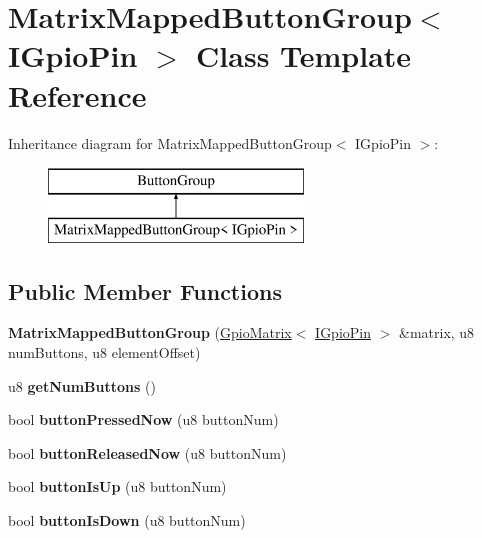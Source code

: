 \hypertarget{class_matrix_mapped_button_group}{}\section{Matrix\+Mapped\+Button\+Group$<$ I\+Gpio\+Pin $>$ Class Template Reference}
\label{class_matrix_mapped_button_group}
Inheritance diagram for Matrix\+Mapped\+Button\+Group$<$ I\+Gpio\+Pin $>$\+:\begin{figure}[H]
\begin{center}
\leavevmode
\includegraphics[height=2.000000cm]{class_matrix_mapped_button_group}
\end{center}
\end{figure}
\subsection*{Public Member Functions}
\begin{DoxyCompactItemize}
\item 
\mbox{\label{class_matrix_mapped_button_group_ab7ef8f08bf5dadc2a6761067f891e95e}} 
{\bfseries Matrix\+Mapped\+Button\+Group} (\mbox{\hyperlink{class_gpio_matrix}{Gpio\+Matrix}}$<$ \mbox{\hyperlink{class_i_gpio_pin}{I\+Gpio\+Pin}} $>$ \&matrix, u8 num\+Buttons, u8 element\+Offset)
\item 
\mbox{\label{class_matrix_mapped_button_group_a47bf73a3e9dadc326373af0a37f995e8}} 
u8 {\bfseries get\+Num\+Buttons} ()
\item 
\mbox{\label{class_matrix_mapped_button_group_a26989b44c1cec78df4eed4bf7f141c07}} 
bool {\bfseries button\+Pressed\+Now} (u8 button\+Num)
\item 
\mbox{\label{class_matrix_mapped_button_group_aa7d98682ed3fe692878c647ae25b000b}} 
bool {\bfseries button\+Released\+Now} (u8 button\+Num)
\item 
\mbox{\label{class_matrix_mapped_button_group_aaa0cd6f4e8e7a99cde87e42877212f56}} 
bool {\bfseries button\+Is\+Up} (u8 button\+Num)
\item 
\mbox{\label{class_matrix_mapped_button_group_ac99bee699e6757cf792ac3b05db4ef80}} 
bool {\bfseries button\+Is\+Down} (u8 button\+Num)
\end{DoxyCompactItemize}


